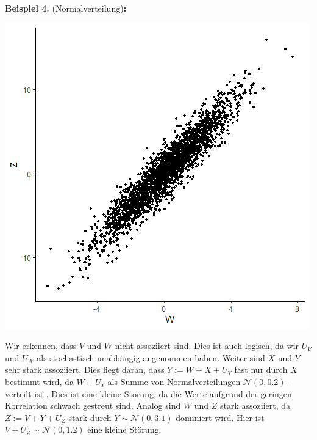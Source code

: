 \documentclass[headsepline,11pt,bibliography=leveldown]{scrbook}
\newcounter{NewZaehler}
\newcommand{\NewZahl}{\refstepcounter{NewZaehler}4.\theNewZaehler}
\newenvironment{NewBeispiel}[1]{\par\medskip\textbf{Beispiel \NewZahl} #1\textbf{:}\\}{\par\medskip}
\begin{document}
\begin{NewBeispiel}{(Normalverteilung)}
\begin{minipage}{0.333\linewidth}
\begin{center}
\end{center}
\vspace*{0\baselineskip}
\end{minipage}
\begin{minipage}{0.333\linewidth}
\begin{center}
	\includegraphics[width=0.9\linewidth]{W_Z_Pre.png}
\end{center}
\vspace*{0\baselineskip}
\end{minipage}

Wir erkennen, dass $V$ und $W$ nicht assoziiert sind. Dies ist auch logisch, da wir $U_V$ und $U_W$ als stochastisch unabhängig angenommen haben. Weiter sind $X$ und $Y$ sehr stark assoziiert. Dies liegt daran, dass $Y := W + X + U_Y$ fast nur durch $X$ bestimmt wird, da $W + U_Y$ als Summe von Normalverteilungen $\mathcal{N}(0, 0.2)$-verteilt ist \cite[S. 59]{MWT}. Dies ist eine kleine Störung, da die Werte aufgrund der geringen Korrelation schwach gestreut sind. Analog sind $W$ und $Z$ stark assoziiert, da $Z := V + Y + U_Z$ stark durch $Y \sim \mathcal{N}(0, 3.1)$ dominiert wird. Hier ist $V + U_Z \sim \mathcal{N}(0, 1.2)$ eine kleine Störung.\\

\begin{minipage}{0.5\linewidth}
\begin{center}
\end{center}
\end{minipage}
\end{NewBeispiel}
\end{document}
